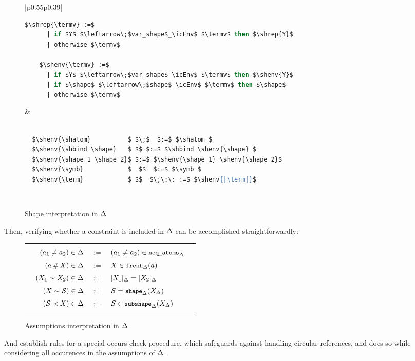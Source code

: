 \documentclass[english, mgr]{iithesis}
\renewcommand{\tt}[1]{\texttt{\small{#1}}}
\newcommand{\NeqAtoms}{\tt{neq\_atoms}}
\newcommand{\Fresh}{\tt{fresh}}
\newcommand{\Shape}{\tt{shape}}
\newcommand{\Subshape}{\tt{subshape}}
\newcommand{\shrep}[2][\icEnv]{\ensuremath{ #2_{#1}}}
\newcommand{\shenv}[2][\icEnv]{\ensuremath{ |#2|_{#1}}}
\begin{document}
\begin{figure}[htbp]
    \begin{tabular}{|p{}p{}|}
        \hline
      \begin{lstlisting}[mathescape, language=OCaml]
    $\shrep{\termv} :=$
      | if $Y$ $\leftarrow\;$var_shape$_\icEnv$ $\termv$ then $\shrep{Y}$
      | otherwise $\termv$

    $\shenv{\termv} :=$
      | if $Y$ $\leftarrow\;$var_shape$_\icEnv$ $\termv$ then $\shenv{Y}$
      | if $\shape$ $\leftarrow\;$shape$_\icEnv$ $\termv$ then $\shape$
      | otherwise $\termv$
        \end{lstlisting}
        &
        \begin{lstlisting}[mathescape, language=OCaml]

  $\shenv{\shatom}          $ $\;$  $:=$ $\shatom $
  $\shenv{\shbind \shape}   $ $$ $:=$ $\shbind \shenv{\shape} $
  $\shenv{\shape_1 \shape_2}$ $:=$ $\shenv{\shape_1} \shenv{\shape_2}$
  $\shenv{\symb}            $  $$  $:=$ $\symb $
  $\shenv{\term}            $ $$  $\;\:\: :=$ $\shenv{|\term|}$
      \end{lstlisting} \\
      \hline
    \end{tabular}
  \caption{Shape interpretation in $\Delta$}
  \label{fig:shape-interpretation}
\end{figure}

Then, verifying whether a constraint is included in $\Delta$ can be accomplished straightforwardly:
\begin{figure}[htbp]
  \centering
  \begin{tabularx}{\textwidth}{|XrclX|}
  \hline & & & & \\
  & $(a_1 \neq a_2) \in \Delta $ & $:=$ & $ (\atomv_1 \cneq \atomv_2) \in \NeqAtoms_{\icEnv} $ & \\
  & $(a \,\#\, X) \in \Delta $ & $:=$ & $ \termv \in \Fresh_{\icEnv}(\atomv) $ & \\
  & $(X_1 \sim X_2) \in \Delta $ & $:=$ & $ \shenv{\termv_1} \ceq \shenv{\termv_2} $ & \\
  & $(X \sim \mathcal{S}) \in \Delta $ & $:=$ & $ \shape = \Shape_{\icEnv}(\shrep{\termv})$ & \\
  & $(\mathcal{S} \prec X) \in \Delta $ & $:=$ & $ \shape \in \Subshape_{\icEnv}(\shrep{\termv})$ & \\ & & & & \\
  \hline
\end{tabularx}
  \caption{Assumptions interpretation in $\Delta$}
  \label{fig:assumptions-interpretation}
\end{figure}
And establish rules for a special occurs check procedure,
which safeguards against handling circular references,
and does so while considering all occurences in the assumptions of $\Delta$.
\end{document}
